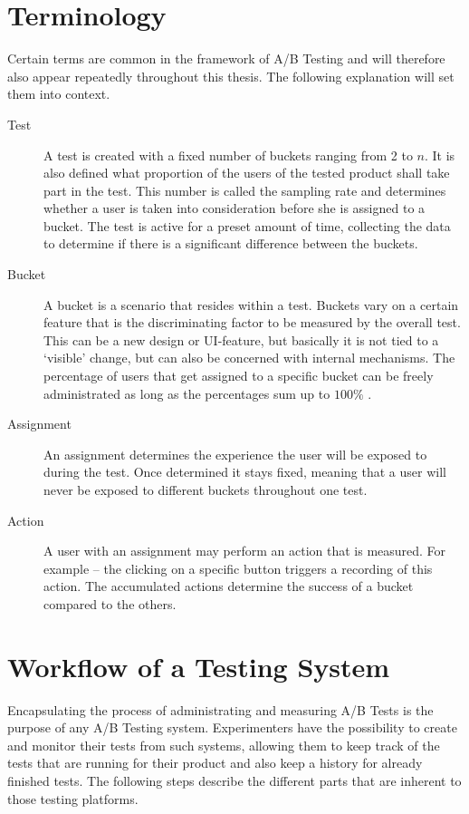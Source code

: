 \documentclass[main.tex]{subfiles}
\begin{document}
\section{Terminology}
Certain terms are common in the framework of A/B Testing and will therefore also appear repeatedly throughout this thesis. The following explanation will set them into context.
\begin{description}
\item[Test]
A test is created with a fixed number of buckets ranging from 2 to $n$. It is also defined what proportion of the users of the tested product shall take part in the test. This number is called the sampling rate and determines whether a user is taken into consideration before she is assigned to a bucket. The test is active for a preset amount of time, collecting the data to determine if there is a significant difference between the buckets.
\item[Bucket]
A bucket is a scenario that resides within a test. Buckets vary on a certain feature that is the discriminating factor to be measured by the overall test. This can be a new design or UI-feature, but basically it is not tied to a `visible' change, but can also be concerned with internal mechanisms. The percentage of users that get assigned to a specific bucket can be freely administrated as long as the percentages sum up to $100\%$ .
\item[Assignment]
An assignment determines the experience the user will be exposed to during the test. Once determined it stays fixed, meaning that a user will never be exposed to different buckets throughout one test.
\item[Action]
A user with an assignment may perform an action that is measured. For example -- the clicking on a specific button triggers a recording of this action. The accumulated actions determine the success of a bucket compared to the others. 
\end{description}
\section{Workflow of a Testing System}
Encapsulating the process of administrating and measuring A/B Tests is the purpose of any A/B Testing system. Experimenters have the possibility to create and monitor their tests from such systems, allowing them to keep track of the tests that are running for their product and also keep a history for already finished tests. The following steps describe the different parts that are inherent to those testing platforms.
\end{document}
